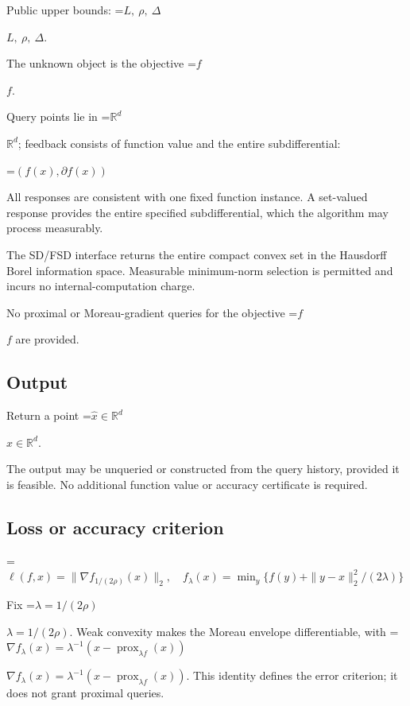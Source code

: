 \documentclass[10pt,a4paper]{article}
\newcommand{\AtlasMath}[1]{\par\begingroup\centering\setbox0=\hbox{$\displaystyle #1$}\ifdim\wd0>1.4\linewidth\typeout{ATLAS WIDE FORMULA: \the\wd0}\fi\ifdim\wd0>\linewidth\resizebox{\linewidth}{!}{\box0}\else\box0\fi\par\endgroup}
\newcommand{\AtlasInlineMath}[1]{\begingroup\setbox0=\hbox{$#1$}\ifdim\wd0>.4\linewidth\endgroup\AtlasMath{#1}\else\endgroup$#1$\fi}
\begin{document}
Public upper bounds: \AtlasInlineMath{L,\ \rho,\ \Delta}.



The unknown object is the objective \AtlasInlineMath{f}.



Query points lie in \AtlasInlineMath{\mathbb{R}^d}; feedback consists of function value and the entire subdifferential:




\AtlasMath{(f(x),\partial f(x))}




All responses are consistent with one fixed function instance. A set-valued response provides the entire specified subdifferential, which the algorithm may process measurably.



The SD/FSD interface returns the entire compact convex set in the Hausdorff Borel information space. Measurable minimum-norm selection is permitted and incurs no internal-computation charge.



No proximal or Moreau-gradient queries for the objective \AtlasInlineMath{f} are provided.



\subsection{Output}


Return a point \AtlasInlineMath{\widehat x\in\mathbb R^d}.



The output may be unqueried or constructed from the query history, provided it is feasible. No additional function value or accuracy certificate is required.



\subsection{Loss or accuracy criterion}



\AtlasMath{\ell(f,x)=\|\nabla f_{1/(2\rho)}(x)\|_2,\quad f_\lambda(x)=\min_y\{f(y)+\|y-x\|_2^2/(2\lambda)\}}




Fix \AtlasInlineMath{\lambda=1/(2\rho)}. Weak convexity makes the Moreau envelope differentiable, with \AtlasInlineMath{\nabla f_\lambda(x)=\lambda^{-1}(x-\operatorname{prox}_{\lambda f}(x))}. This identity defines the error criterion; it does not grant proximal queries.
\end{document}
